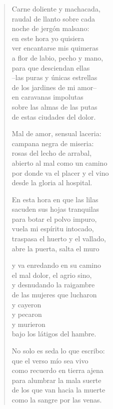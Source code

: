 \documentclass[12pt]{article}
\begin{document}
\clearpage
{}
\begin{verse}

Carne doliente y machacada,\\
raudal de llanto sobre cada\\
noche de jergón malsano:\\
en este hora yo quisiera\\
ver encantarse mis quimeras\\
a flor de labio, pecho y mano,\\
para que desciendan ellas\\
--las puras y únicas estrellas\\
de los jardines de mi amor--\\
en caravanas impolutas\\
sobre las almas de las putas\\
de estas ciudades del dolor.  

Mal de amor, sensual laceria:\\
campana negra de miseria:\\
rosas del lecho de arrabal,\\
abierto al mal como un camino\\
por donde va el placer y el vino\\
desde la gloria al hospital.  

En esta hora en que las lilas\\
sacuden sus hojas tranquilas\\
para botar el polvo impuro,\\
vuela mi espíritu intocado,\\
traspasa el huerto y el vallado,\\
abre la puerta, salta el muro  

y va enredando en su camino\\
el mal dolor, el agrio sino,\\
y desnudando la raigambre\\
de las mujeres que lucharon\\
y cayeron\\
y pecaron\\
y murieron\\
bajo los látigos del hambre.  

No solo es seda lo que escribo:\\
que el verso mío sea vivo\\
como recuerdo en tierra ajena\\
para alumbrar la mala suerte\\
de los que van hacia la muerte\\
como la sangre por las venas.  


\end{verse}
\end{document}
